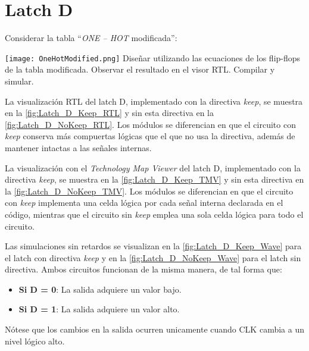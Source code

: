 \section{Latch D \label{sec:s2}}

\begin{center}
	\begin{minipage}{12cm}
		\begin{tcolorbox}[title=Actividad 2]
			Considerar la tabla ``\textit{ONE – HOT} modificada'':\enter
			
				\texttt{[image: OneHotModified.png]}
			Diseñar utilizando las ecuaciones de los flip-flops de la tabla modificada. Observar el resultado en el visor RTL. Compilar y simular.
		\end{tcolorbox}	
	\end{minipage}
\end{center}

La visualización RTL del latch D, implementado con la directiva \textit{keep}, se muestra en la \autoref{fig:Latch_D_Keep_RTL} y sin esta directiva en la \autoref{fig:Latch_D_NoKeep_RTL}. Los módulos se diferencian en que el circuito con \textit{keep} conserva más compuertas lógicas que el que no usa la directiva, además de mantener intactas a las señales internas.

La visualización con el \textit{Technology Map Viewer} del latch D, implementado con la directiva \textit{keep}, se muestra en la \autoref{fig:Latch_D_Keep_TMV} y sin esta directiva en la \autoref{fig:Latch_D_NoKeep_TMV}. Los módulos se diferencian en que el circuito con \textit{keep} implementa una celda lógica por cada señal interna declarada en el código, mientras que el circuito sin \textit{keep} emplea una sola celda lógica para todo el circuito.

Las simulaciones sin retardos se visualizan en la \autoref{fig:Latch_D_Keep_Wave} para el latch con directiva \textit{keep} y en la \autoref{fig:Latch_D_NoKeep_Wave} para el latch sin directiva. Ambos circuitos funcionan de la misma manera, de tal forma que:

\begin{itemize}
	\item \textbf{Si D = 0}: La salida adquiere un valor bajo.
	\item \textbf{Si D = 1}: La salida adquiere un valor alto.
\end{itemize}

Nótese que los cambios en la salida ocurren unicamente cuando CLK cambia a un nivel lógico alto.

